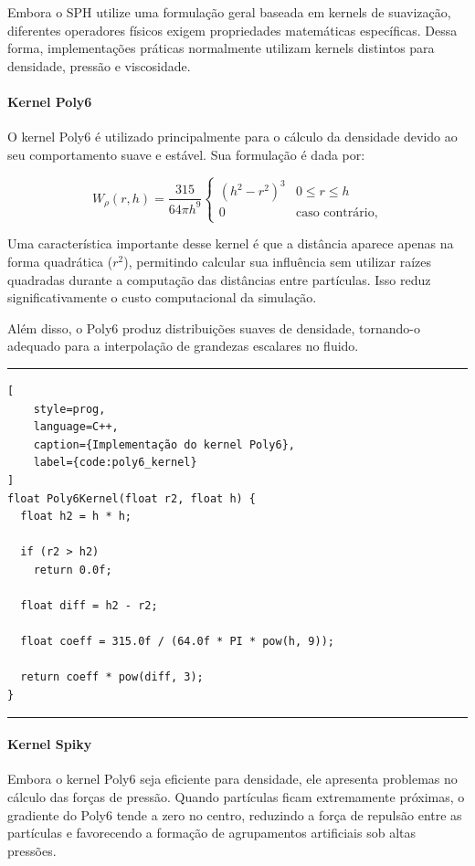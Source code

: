 Embora o SPH utilize uma formulação geral baseada em kernels de suavização,
diferentes operadores físicos exigem propriedades matemáticas específicas.
Dessa forma, implementações práticas normalmente utilizam kernels distintos
para densidade, pressão e viscosidade.

\paragraph{Kernel Poly6}

O kernel Poly6 é utilizado principalmente para o cálculo da densidade devido ao
seu comportamento suave e estável. Sua formulação é dada por:

\begin{equation}
W_{\rho}(r,h) =
\frac{315}{64\pi h^9}
\begin{cases}
(h^2-r^2)^3 & 0 \le r \le h \\
0           & \text{caso contrário,}
\end{cases}
\label{eq:poly6_kernel}
\end{equation}

Uma característica importante desse kernel é que a distância aparece apenas na
forma quadrática (\(r^2\)), permitindo calcular sua influência sem utilizar
raízes quadradas durante a computação das distâncias entre partículas. Isso
reduz significativamente o custo computacional da simulação.

Além disso, o Poly6 produz distribuições suaves de densidade, tornando-o
adequado para a interpolação de grandezas escalares no fluido.

\hfill
\hrule
\begin{lstlisting}[
    style=prog,
    language=C++,
    caption={Implementação do kernel Poly6},
    label={code:poly6_kernel}
]
float Poly6Kernel(float r2, float h) {
  float h2 = h * h;

  if (r2 > h2)
    return 0.0f;

  float diff = h2 - r2;

  float coeff = 315.0f / (64.0f * PI * pow(h, 9));

  return coeff * pow(diff, 3);
}
\end{lstlisting}
\hrule

\paragraph{Kernel Spiky}

Embora o kernel Poly6 seja eficiente para densidade, ele apresenta problemas no
cálculo das forças de pressão. Quando partículas ficam extremamente próximas, o
gradiente do Poly6 tende a zero no centro, reduzindo a força de repulsão entre
as partículas e favorecendo a formação de agrupamentos artificiais sob altas
pressões.

